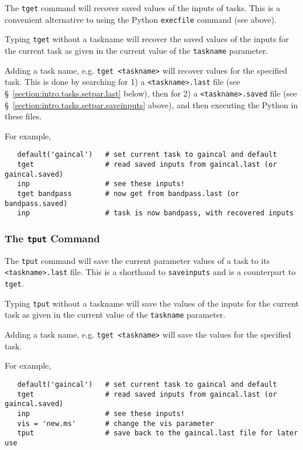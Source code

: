 The {\tt tget} command will recover saved values of the
inputs of tasks.  This is a convenient alternative to using the
Python {\tt execfile} command (see above).

Typing {\tt tget} without a taskname will recover the saved values of the
inputs for the current task as given in the current value of the 
{\tt taskname} parameter.

Adding a task name, e.g. {\tt tget <taskname>} will recover
values for the specified task.  This is done by searching for
1) a {\tt <taskname>.last} file (see 
\S~\ref{section:intro.tasks.setpar.last} below), then for
2) a {\tt <taskname>.saved} file (see
\S~\ref{section:intro.tasks.setpar.saveinputs} above), and then
executing the Python in these files.

For example,
\small
\begin{verbatim}
   default('gaincal')   # set current task to gaincal and default
   tget                 # read saved inputs from gaincal.last (or gaincal.saved)
   inp                  # see these inputs!
   tget bandpass        # now get from bandpass.last (or bandpass.saved)
   inp                  # task is now bandpass, with recovered inputs
\end{verbatim}
\normalsize

\subsubsection{The {\tt tput} Command}
\label{section:intro.tasks.setpar.tput}

The {\tt tput} command will save the current parameter values of a
task to its {\tt <taskname>.last} file.  This is a shorthand to
{\tt saveinputs} and is a counterpart to {\tt tget}.

Typing {\tt tput} without a taskname will save the values of the
inputs for the current task as given in the current value of the 
{\tt taskname} parameter.

Adding a task name, e.g. {\tt tget <taskname>} will save the
values for the specified task.

For example,
\small
\begin{verbatim}
   default('gaincal')   # set current task to gaincal and default
   tget                 # read saved inputs from gaincal.last (or gaincal.saved)
   inp                  # see these inputs!
   vis = 'new.ms'       # change the vis parameter
   tput                 # save back to the gaincal.last file for later use
\end{verbatim}
\normalsize

